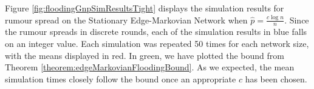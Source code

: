 Figure \ref{fig:floodingGnpSimResultsTight} displays the simulation results for rumour spread on the Stationary Edge-Markovian Network when $\hat{p} = \frac{c \log n}{n}$. 
Since the rumour spreads in discrete rounds, each of the simulation results in blue falls on an integer value. Each simulation was repeated 50 times for each network size, with the means displayed in red. In green, we have plotted the bound from Theorem \ref{theorem:edgeMarkovianFloodingBound}. As we expected, the mean simulation times closely follow the bound once an appropriate $c$ has been chosen. %


